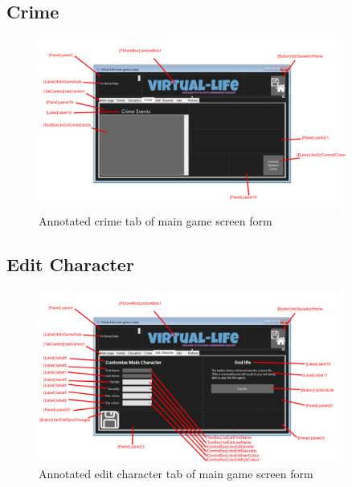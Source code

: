 \subsection{Crime}
\begin{figure}[H]
    \centering
    \includegraphics[width=0.9\textwidth]{images/forms/main-crime.png}
    \caption{Annotated crime tab of main game screen form}
    \label{fig:forms-main-crime}
\end{figure}

\subsection{Edit Character}
\begin{figure}[H]
    \centering
    \includegraphics[width=0.9\textwidth]{images/forms/main-edit.png}
    \caption{Annotated edit character tab of main game screen form}
    \label{fig:forms-main-edit}
\end{figure}

